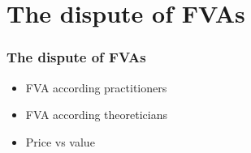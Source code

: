 \documentclass[main.tex]{subfiles}
\begin{document}
    \section{The dispute of FVAs}
    \begin{frame}
        \frametitle{The dispute of FVAs}

        \begin{itemize}
            \item FVA according practitioners
            \item FVA according theoreticians
        \end{itemize}

        \begin{center}
            \resizebox{10cm}{!}{%
            \begin{tikzpicture}
                
            \end{tikzpicture}
            }
        \end{center}

        \begin{itemize}
            \item Price vs value
        \end{itemize}

    \end{frame}
\end{document}
